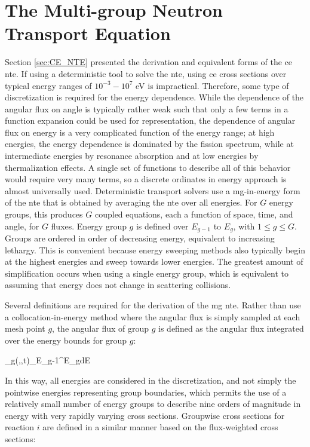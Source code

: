 \section{The Multi-group Neutron Transport Equation}

Section \ref{sec:CE_NTE} presented the derivation and equivalent forms of the \gls{ce} \gls{nte}. If using a deterministic tool to solve the \gls{nte}, using \gls{ce} cross sections over typical energy ranges of \(10^{-3}-10^7\) eV is impractical. Therefore, some type of discretization is required for the energy dependence. While the dependence of the angular flux on angle is typically rather weak such that only a few terms in a function expansion could be used for representation, the dependence of angular flux on energy is a very complicated function of the energy range; at high energies, the energy dependence is dominated by the fission spectrum, while at intermediate energies by resonance absorption and at low energies by thermalization effects. A single set of functions to describe all of this behavior would require very many terms, so a discrete ordinates in energy approach is almost universally used. Deterministic transport solvers use a \gls{mg}-in-energy form of the \gls{nte} that is obtained by averaging the \gls{nte} over all energies. For \(G\) energy groups, this produces \(G\) coupled equations, each a function of space, time, and angle, for \(G\) fluxes. Energy group \(g\) is defined over \(E_{g-1}\) to \(E_{g}\), with \(1\leq g\leq G\). Groups are ordered in order of decreasing energy, equivalent to increasing lethargy. This is convenient because energy sweeping methods also typically begin at the highest energies and sweep towards lower energies. The greatest amount of simplification occurs when using a single energy group, which is equivalent to assuming that energy does not change in scattering collisions.

Several definitions are required for the derivation of the \gls{mg} \gls{nte}. Rather than use a collocation-in-energy method where the angular flux is simply sampled at each mesh point \(g\), the angular flux of group \(g\) is defined as the angular flux integrated over the energy bounds for group \(g\):

\beq
\label{eq:GroupwiseQuantity}
\psi_g(,\hO,t)\equiv\int_{E_{g-1}}^{E_g}dE\psi\seat
\eeq

In this way, all energies are considered in the discretization, and not simply the pointwise energies representing group boundaries, which permits the use of a relatively small number of energy groups to describe nine orders of magnitude in energy with very rapidly varying cross sections. Groupwise cross sections for reaction \(i\) are defined in a similar manner based on the flux-weighted cross sections:

